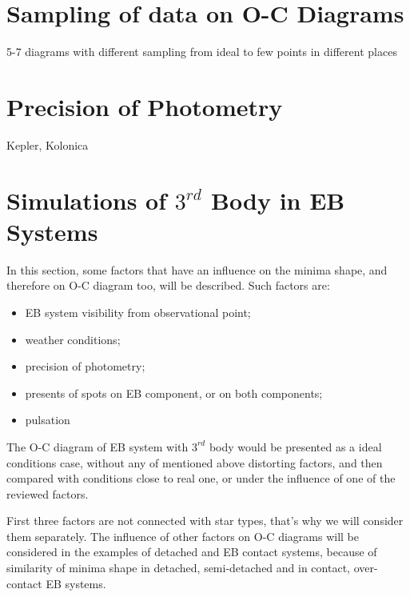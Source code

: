 %

\section{Sampling of data on O-C Diagrams}
5-7 diagrams with different sampling from ideal to few points in different places

\section{Precision of Photometry}
Kepler, Kolonica

\section{Simulations of $3^{rd}$ Body in EB Systems}

In this section, some factors that have an influence on the minima shape, and therefore on O-C diagram too, will be described.  
Such factors are:
\begin{itemize}[noitemsep,nolistsep]
\item EB system visibility from observational point;
\item weather conditions;
\item precision of photometry;
\item presents of spots on EB component, or on both components;
\item pulsation   
\end{itemize}

The O-C diagram of EB system with $3^{rd}$ body would be presented as a ideal conditions case, without any of mentioned above distorting factors, and then compared with conditions close to real one, or under the influence of one of the reviewed factors.

First three factors are not connected with star types, that's why we will consider them separately.
The influence of other factors on O-C diagrams will be considered in the examples of detached and EB contact systems, because of similarity of minima shape in detached, semi-detached and in contact, over-contact EB systems. 

